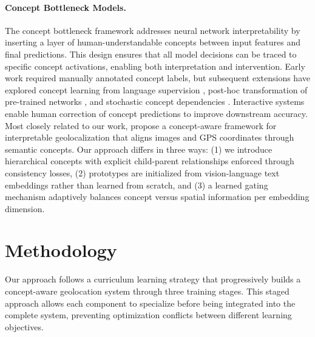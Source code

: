 \documentclass{uva-inf-article}
\begin{document}
\paragraph{Concept Bottleneck Models.}
The concept bottleneck framework \parencite{koh2020concept} addresses neural network interpretability by inserting a layer of human-understandable concepts between input features and final predictions. This design ensures that all model decisions can be traced to specific concept activations, enabling both interpretation and intervention. Early work required manually annotated concept labels, but subsequent extensions have explored concept learning from language supervision \parencite{yang2023language}, post-hoc transformation of pre-trained networks \parencite{yuksekgonul2022posthoc}, and stochastic concept dependencies \parencite{vandenhirtz2024stochastic}. Interactive systems \parencite{chauhan2023interactive} enable human correction of concept predictions to improve downstream accuracy. Most closely related to our work, \cite{jia2025interpretable} propose a concept-aware framework for interpretable geolocalization that aligns images and GPS coordinates through semantic concepts. Our approach differs in three ways: (1) we introduce hierarchical concepts with explicit child-parent relationships enforced through consistency losses, (2) prototypes are initialized from vision-language text embeddings rather than learned from scratch, and (3) a learned gating mechanism adaptively balances concept versus spatial information per embedding dimension.


\section{Methodology}
\label{sec:methodology}

Our approach follows a curriculum learning strategy \parencite{bengio2009curriculum} that progressively builds a concept-aware geolocation system through three training stages. This staged approach allows each component to specialize before being integrated into the complete system, preventing optimization conflicts between different learning objectives.
\end{document}
